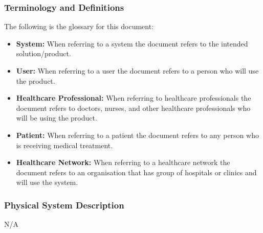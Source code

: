 \documentclass[12pt]{article}
\begin{document}
\subsubsection{Terminology and Definitions} \label{sec_TerminologyDefinitions}

The following is the glossary for this document:

\begin{itemize}
  \item \textbf{System:} When referring to a system the document refers to the intended solution/product.
  \item \textbf{User:} When referring to a user the document refers to a person who will use the product.
  \item \textbf{Healthcare Professional:} When referring to healthcare professionals the document refers to doctors, nurses, and other healthcare professionals who will be using the product.
  \item \textbf{Patient:} When referring to a patient the document refers to any person who is receiving medical treatment.
  \item \textbf{Healthcare Network:} When referring to a healthcare network the document refers to an organisation that has group of hospitals or clinics and will use the system.
\end{itemize}


\subsubsection{Physical System Description} \label{sec_phySystDescrip}
N/A
\end{document}
